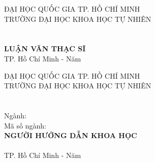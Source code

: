 \thispagestyle{empty}
\begin{center}

{\large ĐẠI HỌC QUỐC GIA TP. HỒ CHÍ MINH}\\[0.3em]
{\large TRƯỜNG ĐẠI HỌC KHOA HỌC TỰ NHIÊN}\\[6em]

{\Large \HocVien}\\[5em]

{\LARGE\bfseries \MakeUppercase{\TenDeTai}}\\[6em]

{\Large\bfseries LUẬN VĂN THẠC SĨ}\\[8em]

{\large TP. Hồ Chí Minh - Năm \NamBaoVe}

\end{center}
\clearpage

\thispagestyle{empty}
\begin{center}

{\large ĐẠI HỌC QUỐC GIA TP. HỒ CHÍ MINH}\\[0.3em]
{\large TRƯỜNG ĐẠI HỌC KHOA HỌC TỰ NHIÊN}\\[4.5em]

{\Large \HocVien}\\[4em]

{\LARGE\bfseries \MakeUppercase{\TenDeTai}}\\[4em]

{\large Ngành: \MakeUppercase{\Nganh}}\\[0.4em]
{\large Mã số ngành: \MaNganh}\\[4em]

{\large\bfseries NGƯỜI HƯỚNG DẪN KHOA HỌC}\\[0.4em]
{\large \GVHD}\\[6em]

{\large TP. Hồ Chí Minh - Năm \NamBaoVe}

\end{center}
\clearpage

